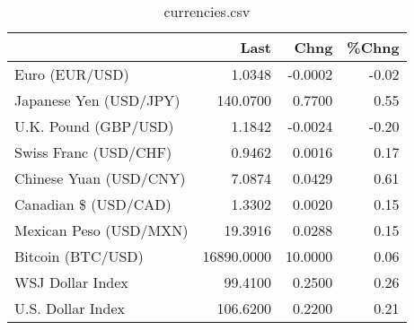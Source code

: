 \documentclass{article}%
\begin{document}
%


\begin{table}[htbp]%
\caption{currencies.csv}%
\centering%
\begin{adjustbox}{width=1\textwidth}%
\begin{tabular}{lrrr}
\toprule
                       &       Last &    Chng &  \%Chng \\
\midrule
        Euro (EUR/USD) &     1.0348 & -0.0002 &  -0.02 \\
Japanese Yen (USD/JPY) &   140.0700 &  0.7700 &   0.55 \\
  U.K. Pound (GBP/USD) &     1.1842 & -0.0024 &  -0.20 \\
 Swiss Franc (USD/CHF) &     0.9462 &  0.0016 &   0.17 \\
Chinese Yuan (USD/CNY) &     7.0874 &  0.0429 &   0.61 \\
  Canadian \$ (USD/CAD) &     1.3302 &  0.0020 &   0.15 \\
Mexican Peso (USD/MXN) &    19.3916 &  0.0288 &   0.15 \\
     Bitcoin (BTC/USD) & 16890.0000 & 10.0000 &   0.06 \\
      WSJ Dollar Index &    99.4100 &  0.2500 &   0.26 \\
     U.S. Dollar Index &   106.6200 &  0.2200 &   0.21 \\
\bottomrule
\end{tabular}
%
\end{adjustbox}%
\end{table}

%
\end{document}
